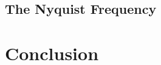 \documentclass[11pt]{article}
\begin{document}

\subsection{The Nyquist Frequency}




\section{Conclusion}

\end{document}
